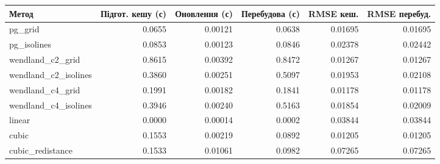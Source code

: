 \begin{tabular}{lrrrrr}\toprule
Метод & Підгот. кешу (с) & Оновлення (с) & Перебудова (с) & RMSE кеш. & RMSE перебуд. \\ \midrule
pg\_grid & 0.0655 & 0.00121 & 0.0638 & 0.01695 & 0.01695 \\
pg\_isolines & 0.0853 & 0.00123 & 0.0846 & 0.02378 & 0.02442 \\
wendland\_c2\_grid & 0.8615 & 0.00392 & 0.8472 & 0.01267 & 0.01267 \\
wendland\_c2\_isolines & 0.3860 & 0.00251 & 0.5097 & 0.01953 & 0.02108 \\
wendland\_c4\_grid & 0.1991 & 0.00182 & 0.1841 & 0.01178 & 0.01178 \\
wendland\_c4\_isolines & 0.3946 & 0.00240 & 0.5163 & 0.01854 & 0.02009 \\
linear & 0.0000 & 0.00014 & 0.0002 & 0.03844 & 0.03844 \\
cubic & 0.1553 & 0.00219 & 0.0892 & 0.01205 & 0.01205 \\
cubic\_redistance & 0.1533 & 0.01061 & 0.0982 & 0.07265 & 0.07265 \\
\bottomrule\end{tabular}
